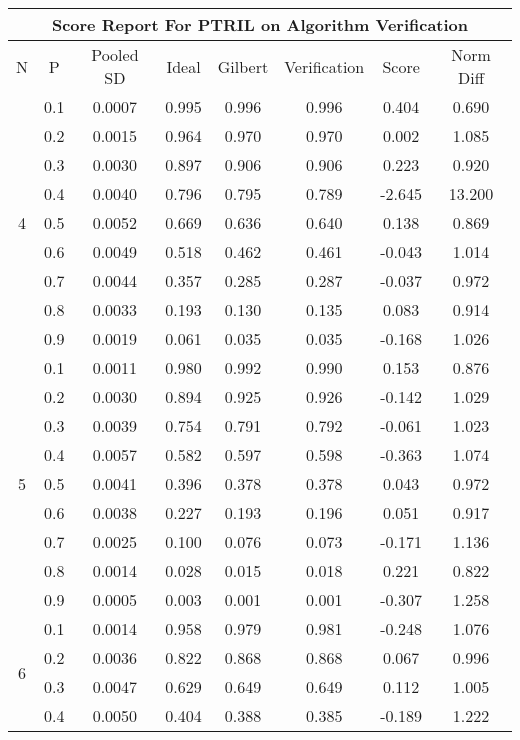 \documentclass[11pt,a4paper]{report}
\begin{document}
\begin{longtable}{ | c | c || c | c | c | c | c | c | }
\hline
\multicolumn{8}{|c|}{ Score Report For PTRIL on Algorithm Verification} \\
\hline
N & P & Pooled SD &  Ideal &  Gilbert & Verification  & Score & Norm Diff \\
 \hline
 \hline
 \endhead
\multirow{9}{*}{4} & 0.1 & 0.0007 & 0.995 & 0.996 & 0.996 & 0.404 & 0.690 \\
 & 0.2 & 0.0015 & 0.964 & 0.970 & 0.970 & 0.002 & 1.085 \\
 & 0.3 & 0.0030 & 0.897 & 0.906 & 0.906 & 0.223 & 0.920 \\
 & 0.4 & 0.0040 & 0.796 & 0.795 & 0.789 & -2.645 & 13.200 \\
 & 0.5 & 0.0052 & 0.669 & 0.636 & 0.640 & 0.138 & 0.869 \\
 & 0.6 & 0.0049 & 0.518 & 0.462 & 0.461 & -0.043 & 1.014 \\
 & 0.7 & 0.0044 & 0.357 & 0.285 & 0.287 & -0.037 & 0.972 \\
 & 0.8 & 0.0033 & 0.193 & 0.130 & 0.135 & 0.083 & 0.914 \\
 & 0.9 & 0.0019 & 0.061 & 0.035 & 0.035 & -0.168 & 1.026 \\
 \hline
\multirow{9}{*}{5} & 0.1 & 0.0011 & 0.980 & 0.992 & 0.990 & 0.153 & 0.876 \\
 & 0.2 & 0.0030 & 0.894 & 0.925 & 0.926 & -0.142 & 1.029 \\
 & 0.3 & 0.0039 & 0.754 & 0.791 & 0.792 & -0.061 & 1.023 \\
 & 0.4 & 0.0057 & 0.582 & 0.597 & 0.598 & -0.363 & 1.074 \\
 & 0.5 & 0.0041 & 0.396 & 0.378 & 0.378 & 0.043 & 0.972 \\
 & 0.6 & 0.0038 & 0.227 & 0.193 & 0.196 & 0.051 & 0.917 \\
 & 0.7 & 0.0025 & 0.100 & 0.076 & 0.073 & -0.171 & 1.136 \\
 & 0.8 & 0.0014 & 0.028 & 0.015 & 0.018 & 0.221 & 0.822 \\
 & 0.9 & 0.0005 & 0.003 & 0.001 & 0.001 & -0.307 & 1.258 \\
 \hline
\multirow{9}{*}{6} & 0.1 & 0.0014 & 0.958 & 0.979 & 0.981 & -0.248 & 1.076 \\
 & 0.2 & 0.0036 & 0.822 & 0.868 & 0.868 & 0.067 & 0.996 \\
 & 0.3 & 0.0047 & 0.629 & 0.649 & 0.649 & 0.112 & 1.005 \\
 & 0.4 & 0.0050 & 0.404 & 0.388 & 0.385 & -0.189 & 1.222 \\

\end{longtable}
\end{document}
